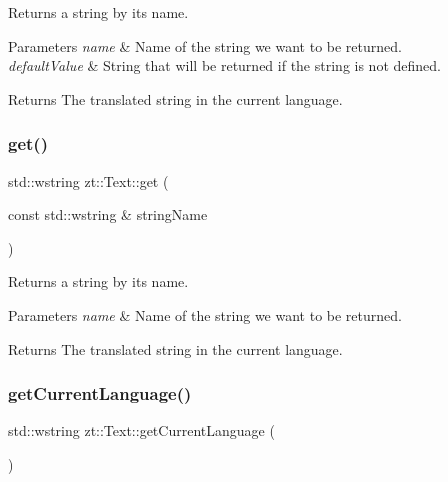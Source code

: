 Returns a string by its name. 


\begin{DoxyParams}{Parameters}
{\em name} & Name of the string we want to be returned. \\
\hline
{\em default\+Value} & String that will be returned if the string is not defined. \\
\hline
\end{DoxyParams}
\begin{DoxyReturn}{Returns}
The translated string in the current language. 
\end{DoxyReturn}
\mbox{\label{classzt_1_1_text_aa02ab4ea1b6e1c1eaf85d351ad2a7856}} 
\subsubsection{\texorpdfstring{get()}{get()}\hspace{0.1cm}{\footnotesize\ttfamily [2/2]}}
{\footnotesize\ttfamily std\+::wstring zt\+::\+Text\+::get (\begin{DoxyParamCaption}\item[{const std\+::wstring \&}]{string\+Name }\end{DoxyParamCaption})}



Returns a string by its name. 


\begin{DoxyParams}{Parameters}
{\em name} & Name of the string we want to be returned. \\
\hline
\end{DoxyParams}
\begin{DoxyReturn}{Returns}
The translated string in the current language. 
\end{DoxyReturn}
\mbox{\label{classzt_1_1_text_ab2f3d33611e50977d0002d22d03b823a}} 
\subsubsection{\texorpdfstring{get\+Current\+Language()}{getCurrentLanguage()}}
{\footnotesize\ttfamily std\+::wstring zt\+::\+Text\+::get\+Current\+Language (\begin{DoxyParamCaption}{ }\end{DoxyParamCaption})}

